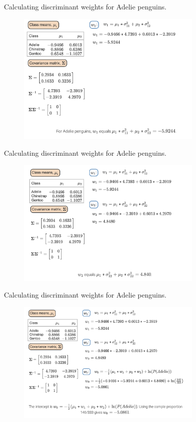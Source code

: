 \documentclass[10pt,dvipsnames]{beamer}
\begin{document}
\begin{frame}{Calculating discriminant weights for Adelie penguins.}
	\begin{figure}[ht]
		\centering
		\includegraphics[width=0.8\textwidth]{imgs/df_8.png}
	\end{figure}
\end{frame}

\begin{frame}{Calculating discriminant weights for Adelie penguins.}
	\begin{figure}[ht]
		\centering
		\includegraphics[width=0.8\textwidth]{imgs/df_9.png}
	\end{figure}
\end{frame}

\begin{frame}{Calculating discriminant weights for Adelie penguins.}
	\begin{figure}[ht]
		\centering
		\includegraphics[width=0.8\textwidth]{imgs/df_10.png}
	\end{figure}
\end{frame}
\end{document}
